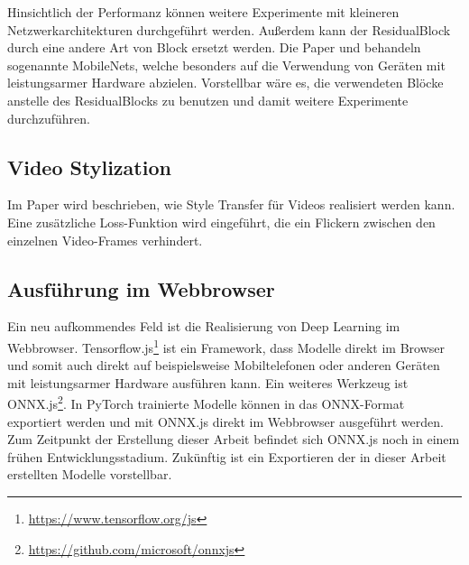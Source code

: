 Hinsichtlich der Performanz können weitere Experimente mit kleineren Netzwerkarchitekturen durchgeführt werden. Außerdem kann der ResidualBlock durch eine andere Art von Block ersetzt werden. Die Paper \cite{DBLP:journals/corr/HowardZCKWWAA17} und \cite{DBLP:journals/corr/abs-1801-04381} behandeln sogenannte MobileNets, welche besonders auf die Verwendung von Geräten mit leistungsarmer Hardware abzielen. Vorstellbar wäre es, die verwendeten Blöcke anstelle des ResidualBlocks zu benutzen und damit weitere Experimente durchzuführen.

\subsection{Video Stylization}
\label{sec:video_stylization}

Im Paper \cite{DBLP:journals/corr/abs-1807-01197} wird beschrieben, wie Style Transfer für Videos realisiert werden kann. Eine zusätzliche Loss-Funktion wird eingeführt, die ein Flickern zwischen den einzelnen Video-Frames verhindert.

\subsection{Ausführung im Webbrowser}
\label{sec:inference_in_browser}

Ein neu aufkommendes Feld ist die Realisierung von Deep Learning im Webbrowser. Tensorflow.js\footnote{\url{https://www.tensorflow.org/js}} ist ein Framework, dass Modelle direkt im Browser und somit auch direkt auf beispielsweise Mobiltelefonen oder anderen Geräten mit leistungsarmer Hardware ausführen kann. Ein weiteres Werkzeug ist ONNX.js\footnote{\url{https://github.com/microsoft/onnxjs}}. In PyTorch trainierte Modelle können in das ONNX-Format exportiert werden und mit ONNX.js direkt im Webbrowser ausgeführt werden. Zum Zeitpunkt der Erstellung dieser Arbeit befindet sich ONNX.js noch in einem frühen Entwicklungsstadium. Zukünftig ist ein Exportieren der in dieser Arbeit erstellten Modelle vorstellbar.